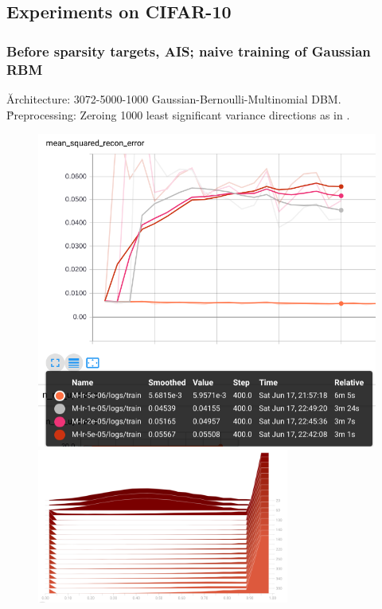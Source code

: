 \clearpage
\newpage
\subsection{Experiments on CIFAR-10}
\subsubsection{Before sparsity targets, AIS; naive training of Gaussian RBM}
\u{Architecture}: 3072-5000-1000 Gaussian-Bernoulli-Multinomial DBM.
\\[0.5em]
\u{Preprocessing}: Zeroing 1000 least significant variance directions as in \cite{krizhevsky2009learning}.
\clearpage

\begin{figure}[h]
\begin{mdframed}
\centering
\includegraphics[width=5in]{dbm-cifar/instab.png}
\\[2em]
\includegraphics[height=2in]{dbm-cifar/mu_before.png}

\end{mdframed}
\end{figure}
